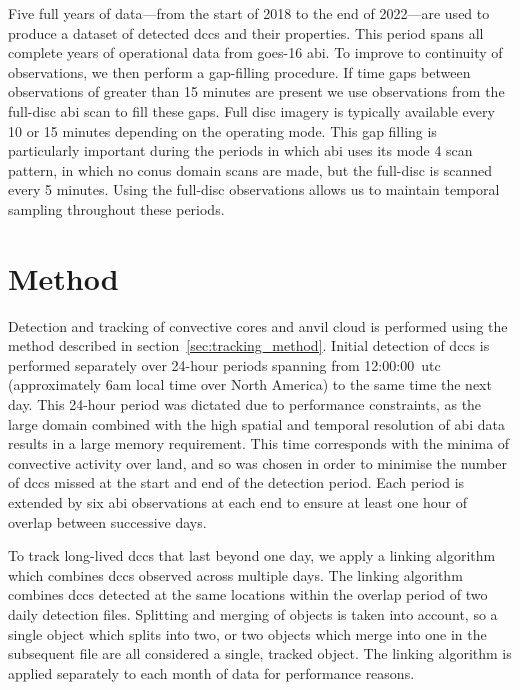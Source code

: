 Five full years of data---from the start of 2018 to the end of 2022---are used to produce a dataset of detected \acrshort{dcc}s and their properties.
This period spans all complete years of operational data from \acrshort{goes}-16 \acrshort{abi}.
To improve to continuity of observations, we then perform a gap-filling procedure.
If time gaps between observations of greater than 15 minutes are present we use observations from the full-disc \acrshort{abi} scan to fill these gaps.
Full disc imagery is typically available every 10 or 15 minutes depending on the operating mode.
This gap filling is particularly important during the periods in which \acrshort{abi} uses its mode 4 scan pattern, in which no \acrshort{conus} domain scans are made, but the full-disc is scanned every 5 minutes.
Using the full-disc observations allows us to maintain temporal sampling throughout these periods.


\section{Method}

Detection and tracking of convective cores and anvil cloud is performed using the method described in section~\ref{sec:tracking_method}.
Initial detection of \acrshort{dcc}s is performed separately over 24-hour periods spanning from 12:00:00~\acrshort{utc} (approximately 6am local time over North America) to the same time the next day.
This 24-hour period was dictated due to performance constraints, as the large domain combined with the high spatial and temporal resolution of \acrshort{abi} data results in a large memory requirement.
This time corresponds with the minima of convective activity over land, and so was chosen in order to minimise the number of \acrshort{dcc}s missed at the start and end of the detection period.
Each period is extended by six \acrshort{abi} observations at each end to ensure at least one hour of overlap between successive days.

To track long-lived \acrshort{dcc}s that last beyond one day, we apply a linking algorithm which combines \acrshort{dcc}s observed across multiple days.
The linking algorithm combines \acrshort{dcc}s detected at the same locations within the overlap period of two daily detection files.
Splitting and merging of objects is taken into account, so a single object which splits into two, or two objects which merge into one in the subsequent file are all considered a single, tracked object.
The linking algorithm is applied separately to each month of data for performance reasons.

